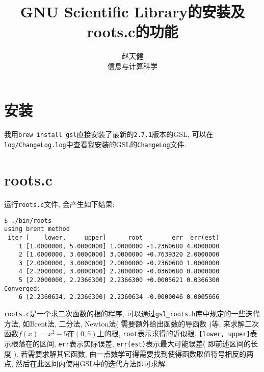 \documentclass{ctexart}
\title{GNU Scientific Library的安装及roots.c的功能}
\author{赵天健 \\ 信息与计算科学\quad 3210101830}
\begin{document}
\maketitle

\section{安装}
我用\verb!brew install gsl!直接安装了最新的\verb!2.7.1!版本的GSL, 可以在\verb!log/ChangeLog.log!中查看我安装的GSL的\verb!ChangeLog!文件.

\section{roots.c}
运行\verb!roots.c!文件, 会产生如下结果:
\begin{verbatim}
$ ./bin/roots
using brent method
 iter [    lower,     upper]      root        err  err(est)
    1 [1.0000000, 5.0000000] 1.0000000 -1.2360680 4.0000000
    2 [1.0000000, 3.0000000] 3.0000000 +0.7639320 2.0000000
    3 [2.0000000, 3.0000000] 2.0000000 -0.2360680 1.0000000
    4 [2.2000000, 3.0000000] 2.2000000 -0.0360680 0.8000000
    5 [2.2000000, 2.2366300] 2.2366300 +0.0005621 0.0366300
Converged:
    6 [2.2360634, 2.2366300] 2.2360634 -0.0000046 0.0005666
\end{verbatim}
\par \verb!roots.c!是一个求二次函数的根的程序, 可以通过\verb!gsl_roots.h!库中规定的一些迭代方法, 如Brent法, 二分法, Newton法( 需要额外给出函数的导函数 )等, 来求解二次函数$f(x)=x^2-5$在$(0, 5)$上的根, \verb!root!表示求得的近似根, \verb![lower, upper]!表示根落在的区间, \verb!err!表示实际误差, \verb!err(est)!表示最大可能误差( 即前述区间的长度 ). 若需要求解其它函数, 由一点数学可得需要找到使得函数取值符号相反的两点, 然后在此区间内使用GSL中的迭代方法即可求解.
\end{document}
